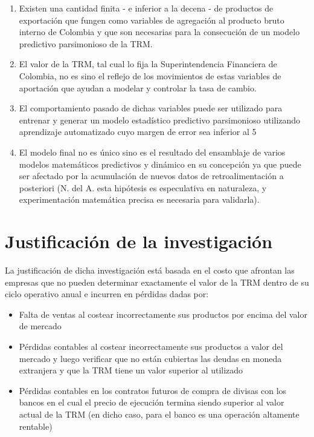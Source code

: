 \begin{enumerate}
    \item Existen una cantidad finita - e inferior a la decena - de productos de exportación que fungen como variables de agregación al producto bruto interno de Colombia y que son necesarias para la consecución de un modelo predictivo parsimonioso de la TRM.
    \item El valor de la TRM, tal cual lo fija la Superintendencia Financiera de Colombia, no es sino el reflejo de los movimientos de estas variables de aportación que ayudan a modelar y controlar la tasa de cambio.
    \item El comportamiento pasado de dichas variables puede ser utilizado para entrenar y generar un modelo estadístico predictivo parsimonioso utilizando aprendizaje automatizado cuyo margen de error sea inferior al 5%
    \item El modelo final no es único sino es el resultado del ensamblaje de varios modelos matemáticos predictivos y dinámico en su concepción ya que puede ser afectado por la acumulación de nuevos datos de retroalimentación a posteriori (N. del A. esta hipótesis es especulativa en naturaleza, y experimentación matemática precisa es necesaria para validarla). 
\end{enumerate}

\section{Justificación de la investigación}
La justificación de dicha investigación está basada en el costo que afrontan las empresas que no pueden determinar exactamente el valor de la TRM dentro de su ciclo operativo anual e incurren en pérdidas dadas por:

\begin{itemize}
    \item Falta de ventas al costear incorrectamente sus productos por encima del valor de mercado
    \item Pérdidas contables al costear incorrectamente sus productos a valor del mercado y luego verificar que no están cubiertas las deudas en moneda extranjera y que la TRM tiene un valor superior al utilizado
    \item Pérdidas contables en los contratos futuros de compra de divisas con los bancos en el cual el precio de ejecución termina siendo superior al valor actual de la TRM (en dicho caso, para el banco es una operación altamente rentable)    
\end{itemize}

